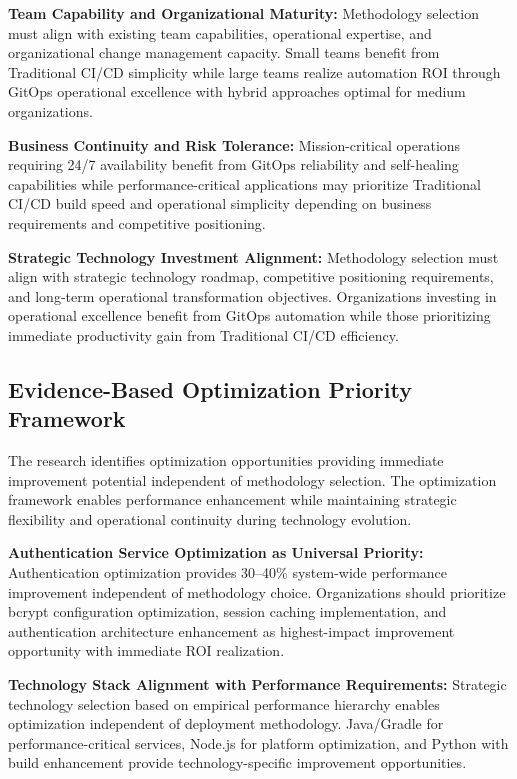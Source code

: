 \textbf{Team Capability and Organizational Maturity:}
Methodology selection must align with existing team capabilities, operational expertise, and organizational change management capacity. Small teams benefit from Traditional CI/CD simplicity while large teams realize automation ROI through GitOps operational excellence with hybrid approaches optimal for medium organizations.

\textbf{Business Continuity and Risk Tolerance:}
Mission-critical operations requiring 24/7 availability benefit from GitOps reliability and self-healing capabilities while performance-critical applications may prioritize Traditional CI/CD build speed and operational simplicity depending on business requirements and competitive positioning.

\textbf{Strategic Technology Investment Alignment:}
Methodology selection must align with strategic technology roadmap, competitive positioning requirements, and long-term operational transformation objectives. Organizations investing in operational excellence benefit from GitOps automation while those prioritizing immediate productivity gain from Traditional CI/CD efficiency.

\subsection{Evidence-Based Optimization Priority Framework}
\label{subsec:optimization_priorities}

The research identifies optimization opportunities providing immediate improvement potential independent of methodology selection. The optimization framework enables performance enhancement while maintaining strategic flexibility and operational continuity during technology evolution.

\textbf{Authentication Service Optimization as Universal Priority:}
Authentication optimization provides 30--40\% system-wide performance improvement independent of methodology choice. Organizations should prioritize bcrypt configuration optimization, session caching implementation, and authentication architecture enhancement as highest-impact improvement opportunity with immediate ROI realization.

\textbf{Technology Stack Alignment with Performance Requirements:}
Strategic technology selection based on empirical performance hierarchy enables optimization independent of deployment methodology. Java/Gradle for performance-critical services, Node.js for platform optimization, and Python with build enhancement provide technology-specific improvement opportunities.

